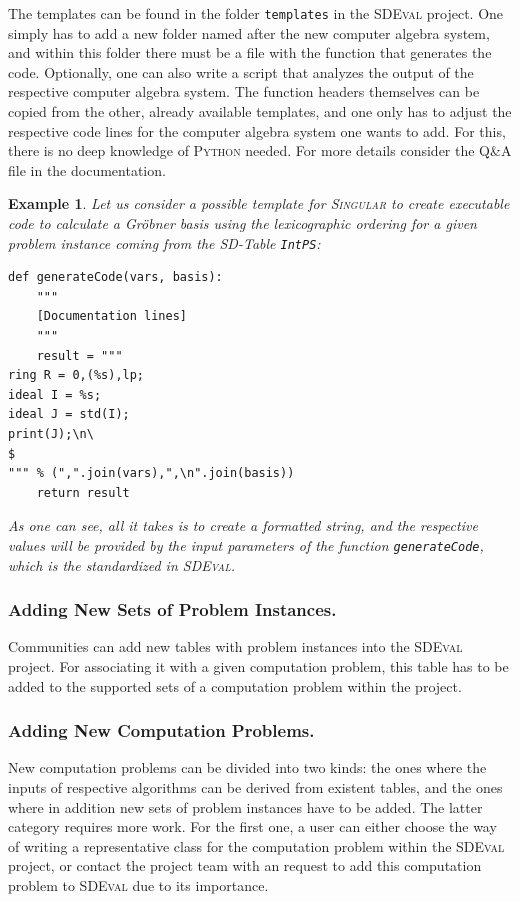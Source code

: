 \documentclass[oribibl,11pt]{article}
\newtheorem{example}{Example}
\begin{document}
 The templates can be found in the folder \texttt{templates} in the
 \textsc{SDEval} project. One simply
 has to add a new folder named after the new computer algebra system, and within this folder there must be a file with
 the function that generates the code. Optionally, one can also write a script that analyzes the output of the respective computer
 algebra system. The function headers themselves 
 can be copied from the other, already available templates, and one
 only has to adjust the respective code lines for the computer
 algebra system one wants to add. For this, there is no deep
 knowledge of \textsc{Python} needed. For more details consider the
 Q\&A file in the documentation.
\vspace*{-10pt}
\begin{example}
  Let us consider a possible template for \textsc{Singular} to create
  executable code to calculate a Gr\"obner basis using the
  lexicographic ordering for a given problem
  instance coming from the SD-Table \texttt{IntPS}:
  \begin{verbatim}
def generateCode(vars, basis):
    """
    [Documentation lines]
    """
    result = """
ring R = 0,(%s),lp;
ideal I = %s;
ideal J = std(I);
print(J);\n\
$
""" % (",".join(vars),",\n".join(basis))
    return result
 \end{verbatim}
As one can see, all it takes is to create a formatted string, and the
respective values will be provided by the input parameters of the
function \texttt{generateCode}, which is the standardized in \textsc{SDEval}.
\end{example}
\vspace*{-10pt}
\subsubsection{Adding New Sets of Problem Instances.}

Communities can add new tables with problem instances into the \textsc{SDEval} project. For associating it with a given computation problem, this table has to be added to the supported sets of a computation problem within the project.

\subsubsection{Adding New Computation Problems.}

New computation problems can be divided into two kinds: the ones where
the inputs of respective algorithms can be derived from existent
tables, and the ones where in addition new sets of problem instances
have to be added. The latter category requires more work. For the first one, a user can either choose the way of writing a representative class for the computation problem within the \textsc{SDEval} project, or contact the project team with an request to add this computation problem to \textsc{SDEval} due to its importance.
\end{document}
